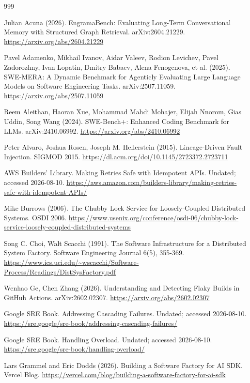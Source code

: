\begin{thebibliography}{999}
 Julian Acuna (2026). EngramaBench: Evaluating Long-Term Conversational Memory with Structured Graph Retrieval. arXiv:2604.21229. \url{https://arxiv.org/abs/2604.21229}

 Pavel Adamenko, Mikhail Ivanov, Aidar Valeev, Rodion Levichev, Pavel Zadorozhny, Ivan Lopatin, Dmitry Babaev, Alena Fenogenova, et al. (2025). SWE-MERA: A Dynamic Benchmark for Agenticly Evaluating Large Language Models on Software Engineering Tasks. arXiv:2507.11059. \url{https://arxiv.org/abs/2507.11059}

 Reem Aleithan, Haoran Xue, Mohammad Mahdi Mohajer, Elijah Nnorom, Gias Uddin, Song Wang (2024). SWE-Bench+: Enhanced Coding Benchmark for LLMs. arXiv:2410.06992. \url{https://arxiv.org/abs/2410.06992}

 Peter Alvaro, Joshua Rosen, Joseph M. Hellerstein (2015). Lineage-Driven Fault Injection. SIGMOD 2015. \url{https://dl.acm.org/doi/10.1145/2723372.2723711}

 AWS Builders' Library. Making Retries Safe with Idempotent APIs. Undated; accessed 2026-08-10. \url{https://aws.amazon.com/builders-library/making-retries-safe-with-idempotent-APIs/}

 Mike Burrows (2006). The Chubby Lock Service for Loosely-Coupled Distributed Systems. OSDI 2006. \url{https://www.usenix.org/conference/osdi-06/chubby-lock-service-loosely-coupled-distributed-systems}

 Song C. Choi, Walt Scacchi (1991). The Software Infrastructure for a Distributed System Factory. Software Engineering Journal 6(5), 355-369. \url{https://www.ics.uci.edu/~wscacchi/Software-Process/Readings/DistSysFactory.pdf}

 Wenhao Ge, Chen Zhang (2026). Understanding and Detecting Flaky Builds in GitHub Actions. arXiv:2602.02307. \url{https://arxiv.org/abs/2602.02307}

 Google SRE Book. Addressing Cascading Failures. Undated; accessed 2026-08-10. \url{https://sre.google/sre-book/addressing-cascading-failures/}

 Google SRE Book. Handling Overload. Undated; accessed 2026-08-10. \url{https://sre.google/sre-book/handling-overload/}

 Lars Grammel and Eric Dodds (2026). Building a Software Factory for AI SDK. Vercel Blog. \url{https://vercel.com/blog/building-a-software-factory-for-ai-sdk}


\end{thebibliography}
